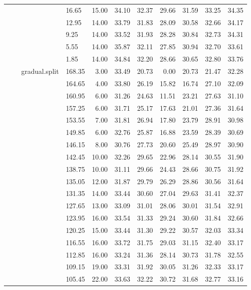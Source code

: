\begin{longtable}{llllrrrrrrr}
   &  &  & 16.65 & 15.00 & 34.10 & 32.37 & 29.66 & 31.59 & 33.25 & 34.35 \\ 
   &  &  & 12.95 & 14.00 & 33.79 & 31.83 & 28.09 & 30.58 & 32.66 & 34.17 \\ 
   &  &  & 9.25 & 14.00 & 33.52 & 31.93 & 28.28 & 30.84 & 32.73 & 34.31 \\ 
   &  &  & 5.55 & 14.00 & 35.87 & 32.11 & 27.85 & 30.94 & 32.70 & 33.61 \\ 
   &  &  & 1.85 & 14.00 & 34.84 & 32.20 & 28.66 & 30.65 & 32.80 & 33.76 \\ 
   &  & gradual.split & 168.35 & 3.00 & 33.49 & 20.73 & 0.00 & 20.73 & 21.47 & 32.28 \\ 
   &  &  & 164.65 & 4.00 & 33.80 & 26.19 & 15.82 & 16.74 & 27.10 & 32.09 \\ 
   &  &  & 160.95 & 6.00 & 31.26 & 24.63 & 11.51 & 23.21 & 27.63 & 31.10 \\ 
   &  &  & 157.25 & 6.00 & 31.71 & 25.17 & 17.63 & 21.01 & 27.36 & 31.64 \\ 
   &  &  & 153.55 & 7.00 & 31.81 & 26.94 & 17.80 & 23.79 & 28.91 & 30.98 \\ 
   &  &  & 149.85 & 6.00 & 32.76 & 25.87 & 16.88 & 23.59 & 28.39 & 30.69 \\ 
   &  &  & 146.15 & 8.00 & 30.76 & 27.73 & 20.60 & 25.49 & 28.97 & 30.90 \\ 
   &  &  & 142.45 & 10.00 & 32.26 & 29.65 & 22.96 & 28.14 & 30.55 & 31.90 \\ 
   &  &  & 138.75 & 10.00 & 31.11 & 29.66 & 24.43 & 28.66 & 30.75 & 31.92 \\ 
   &  &  & 135.05 & 12.00 & 31.87 & 29.79 & 26.29 & 28.86 & 30.56 & 31.64 \\ 
   &  &  & 131.35 & 14.00 & 33.44 & 30.60 & 27.04 & 29.63 & 31.41 & 32.37 \\ 
   &  &  & 127.65 & 13.00 & 33.09 & 31.01 & 28.06 & 30.01 & 31.54 & 32.91 \\ 
   &  &  & 123.95 & 16.00 & 33.54 & 31.33 & 29.24 & 30.60 & 31.84 & 32.66 \\ 
   &  &  & 120.25 & 15.00 & 33.44 & 31.30 & 29.22 & 30.57 & 32.03 & 33.34 \\ 
   &  &  & 116.55 & 16.00 & 33.72 & 31.75 & 29.03 & 31.15 & 32.40 & 33.17 \\ 
   &  &  & 112.85 & 16.00 & 33.24 & 31.36 & 28.14 & 30.73 & 31.78 & 32.55 \\ 
   &  &  & 109.15 & 19.00 & 33.31 & 31.92 & 30.05 & 31.26 & 32.33 & 33.17 \\ 
   &  &  & 105.45 & 22.00 & 33.63 & 32.22 & 30.72 & 31.68 & 32.77 & 33.16 \\ 

\end{longtable}
